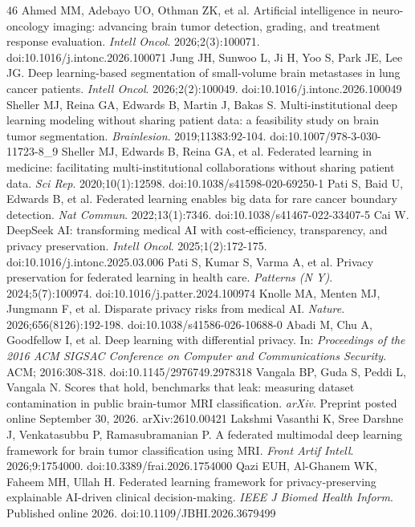 \begin{thebibliography}{46}
 Ahmed MM, Adebayo UO, Othman ZK, et al. Artificial intelligence in neuro-oncology imaging: advancing brain tumor detection, grading, and treatment response evaluation. \textit{Intell Oncol}. 2026;2(3):100071. doi:10.1016/j.intonc.2026.100071
 Jung JH, Sunwoo L, Ji H, Yoo S, Park JE, Lee JG. Deep learning-based segmentation of small-volume brain metastases in lung cancer patients. \textit{Intell Oncol}. 2026;2(2):100049. doi:10.1016/j.intonc.2026.100049
 Sheller MJ, Reina GA, Edwards B, Martin J, Bakas S. Multi-institutional deep learning modeling without sharing patient data: a feasibility study on brain tumor segmentation. \textit{Brainlesion}. 2019;11383:92-104. doi:10.1007/978-3-030-11723-8\_9
 Sheller MJ, Edwards B, Reina GA, et al. Federated learning in medicine: facilitating multi-institutional collaborations without sharing patient data. \textit{Sci Rep}. 2020;10(1):12598. doi:10.1038/s41598-020-69250-1
 Pati S, Baid U, Edwards B, et al. Federated learning enables big data for rare cancer boundary detection. \textit{Nat Commun}. 2022;13(1):7346. doi:10.1038/s41467-022-33407-5
 Cai W. DeepSeek AI: transforming medical AI with cost-efficiency, transparency, and privacy preservation. \textit{Intell Oncol}. 2025;1(2):172-175. doi:10.1016/j.intonc.2025.03.006
 Pati S, Kumar S, Varma A, et al. Privacy preservation for federated learning in health care. \textit{Patterns (N Y)}. 2024;5(7):100974. doi:10.1016/j.patter.2024.100974
 Knolle MA, Menten MJ, Jungmann F, et al. Disparate privacy risks from medical AI. \textit{Nature}. 2026;656(8126):192-198. doi:10.1038/s41586-026-10688-0
 Abadi M, Chu A, Goodfellow I, et al. Deep learning with differential privacy. In: \textit{Proceedings of the 2016 ACM SIGSAC Conference on Computer and Communications Security}. ACM; 2016:308-318. doi:10.1145/2976749.2978318
 Vangala BP, Guda S, Peddi L, Vangala N. Scores that hold, benchmarks that leak: measuring dataset contamination in public brain-tumor MRI classification. \textit{arXiv}. Preprint posted online September 30, 2026. arXiv:2610.00421
 Lakshmi Vasanthi K, Sree Darshne J, Venkatasubbu P, Ramasubramanian P. A federated multimodal deep learning framework for brain tumor classification using MRI. \textit{Front Artif Intell}. 2026;9:1754000. doi:10.3389/frai.2026.1754000
 Qazi EUH, Al-Ghanem WK, Faheem MH, Ullah H. Federated learning framework for privacy-preserving explainable AI-driven clinical decision-making. \textit{IEEE J Biomed Health Inform}. Published online 2026. doi:10.1109/JBHI.2026.3679499

\end{thebibliography}
